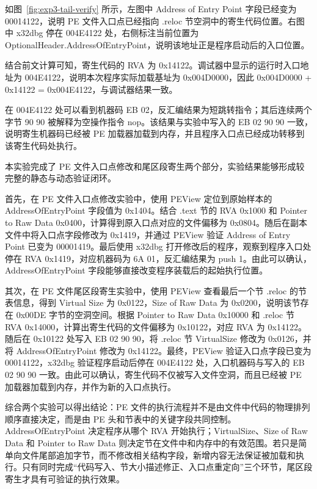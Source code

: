 ﻿\documentclass[12pt]{ctexart}
\begin{document}
如图~\ref{fig:exp3-tail-verify} 所示，左图中 Address of Entry Point 字段已经变为 00014122，说明 PE 文件入口点已经指向 .reloc 节空洞中的寄生代码位置。右图中 x32dbg 停在 004E4122 处，右侧标注当前位置为 OptionalHeader.AddressOfEntryPoint，说明该地址正是程序启动后的入口位置。

结合前文计算可知，寄生代码的 RVA 为 0x14122。调试器中显示的运行时入口地址为 004E4122，说明本次程序实际加载基址为 0x004D0000，因此 0x004D0000 + 0x14122 = 0x004E4122，与调试器结果一致。

在 004E4122 处可以看到机器码 EB 02，反汇编结果为短跳转指令；其后连续两个字节 90 90 被解释为空操作指令 nop。该结果与实验中写入的 EB 02 90 90 一致，说明寄生机器码已经被 PE 加载器加载到内存，并且程序入口点已经成功转移到该寄生代码处执行。

\FloatBarrier

\vspace{1.2cm}


本实验完成了 PE 文件入口点修改和尾区段寄生两个部分，实验结果能够形成较完整的静态与动态验证闭环。

首先，在 PE 文件入口点修改实验中，使用 PEView 定位到原始样本的 AddressOfEntryPoint 字段值为 0x1404。结合 .text 节的 RVA 0x1000 和 Pointer to Raw Data 0x0400，计算得到原入口点对应的文件偏移为 0x0804。随后在副本文件中将入口点字段修改为 0x1419，并通过 PEView 验证 Address of Entry Point 已变为 00001419。最后使用 x32dbg 打开修改后的程序，观察到程序入口处停在 RVA 0x1419，对应机器码为 6A 01，反汇编结果为 push 1。由此可以确认，AddressOfEntryPoint 字段能够直接改变程序装载后的起始执行位置。

其次，在 PE 文件尾区段寄生实验中，使用 PEView 查看最后一个节 .reloc 的节表信息，得到 Virtual Size 为 0x0122，Size of Raw Data 为 0x0200，说明该节存在 0x00DE 字节的空洞空间。根据 Pointer to Raw Data 0x10000 和 .reloc 节 RVA 0x14000，计算出寄生代码的文件偏移为 0x10122，对应 RVA 为 0x14122。随后在 0x10122 处写入 EB 02 90 90，将 .reloc 节 VirtualSize 修改为 0x0126，并将 AddressOfEntryPoint 修改为 0x14122。最终，PEView 验证入口点字段已变为 00014122，x32dbg 验证程序启动后停在 004E4122 处，入口机器码与写入的 EB 02 90 90 一致。由此可以确认，寄生代码不仅被写入文件空洞，而且已经被 PE 加载器加载到内存，并作为新的入口点执行。

综合两个实验可以得出结论：PE 文件的执行流程并不是由文件中代码的物理排列顺序直接决定，而是由 PE 头和节表中的关键字段共同控制。AddressOfEntryPoint 决定程序从哪个 RVA 开始执行；VirtualSize、Size of Raw Data 和 Pointer to Raw Data 则决定节在文件中和内存中的有效范围。若只是简单向文件尾部追加字节，而不修改相关结构字段，新增内容无法保证被加载和执行。只有同时完成“代码写入、节大小描述修正、入口点重定向”三个环节，尾区段寄生才具有可验证的执行效果。
\end{document}

